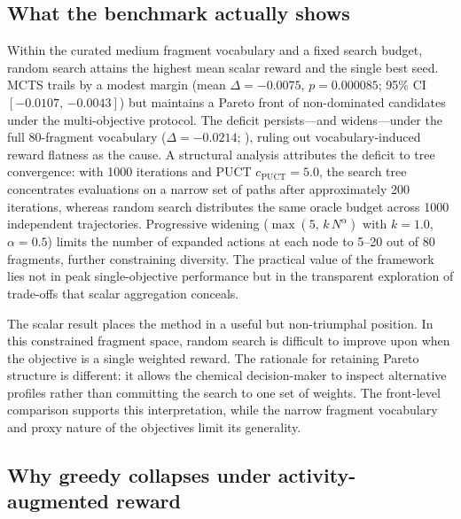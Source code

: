 \documentclass[10pt,a4paper]{article}
\begin{document}
\subsection{What the benchmark actually shows}

Within the curated medium fragment vocabulary and a fixed search budget, random search attains the highest mean scalar reward and the single best seed. MCTS trails by a modest margin (mean $\Delta = \num{-0.0075}$, $p = \num{0.000085}$; 95\% CI $[\num{-0.0107},\,\num{-0.0043}]$) but maintains a Pareto front of non-dominated candidates under the multi-objective protocol. The deficit persists---and widens---under the full \num{80}-fragment vocabulary ($\Delta = \num{-0.0214}$; ), ruling out vocabulary-induced reward flatness as the cause. A structural analysis attributes the deficit to tree convergence: with \num{1000} iterations and PUCT $c_{\text{PUCT}}=\num{5.0}$, the search tree concentrates evaluations on a narrow set of paths after approximately \num{200} iterations, whereas random search distributes the same oracle budget across \num{1000} independent trajectories. Progressive widening ($\max(5,\,k\,N^{\alpha})$ with $k=\num{1.0}$, $\alpha=\num{0.5}$) limits the number of expanded actions at each node to \num{5}--\num{20} out of \num{80} fragments, further constraining diversity. The practical value of the framework lies not in peak single-objective performance but in the transparent exploration of trade-offs that scalar aggregation conceals.

The scalar result places the method in a useful but non-triumphal position. In this constrained fragment space, random search is difficult to improve upon when the objective is a single weighted reward. The rationale for retaining Pareto structure is different: it allows the chemical decision-maker to inspect alternative profiles rather than committing the search to one set of weights. The front-level comparison supports this interpretation, while the narrow fragment vocabulary and proxy nature of the objectives limit its generality.

\subsection{Why greedy collapses under activity-augmented reward}
\end{document}
